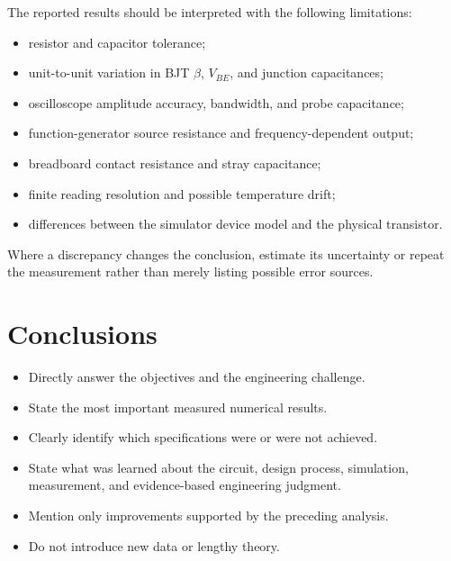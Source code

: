 \documentclass[11pt,a4paper]{article}
\begin{document}
\begin{examplebox}
The reported results should be interpreted with the following limitations:
\begin{itemize}
  \item resistor and capacitor tolerance;
  \item unit-to-unit variation in BJT $\beta$, $V_{BE}$, and junction
        capacitances;
  \item oscilloscope amplitude accuracy, bandwidth, and probe capacitance;
  \item function-generator source resistance and frequency-dependent output;
  \item breadboard contact resistance and stray capacitance;
  \item finite reading resolution and possible temperature drift;
  \item differences between the simulator device model and the physical
        transistor.
\end{itemize}
Where a discrepancy changes the conclusion, estimate its uncertainty or
repeat the measurement rather than merely listing possible error sources.
\end{examplebox}

\section{Conclusions}
\begin{sectionguide}
\begin{itemize}
  \item Directly answer the objectives and the engineering challenge.
  \item State the most important measured numerical results.
  \item Clearly identify which specifications were or were not achieved.
  \item State what was learned about the circuit, design process, simulation,
        measurement, and evidence-based engineering judgment.
  \item Mention only improvements supported by the preceding analysis.
  \item Do not introduce new data or lengthy theory.
\end{itemize}
\end{sectionguide}
\end{document}
